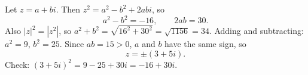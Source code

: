 Let $z=a+bi$. Then $z^2=a^2-b^2+2abi$, so
\[
a^2-b^2=-16,\qquad 2ab=30 .
\]
Also $|z|^2=|z^2|$, so $a^2+b^2=\sqrt{16^2+30^2}=\sqrt{1156}=34$. Adding and subtracting: $a^2=9$, $b^2=25$. Since $ab=15>0$, $a$ and $b$ have the same sign, so
\[
z=\boxed{\pm(3+5i)} .
\]
Check: $(3+5i)^2=9-25+30i=-16+30i$.
